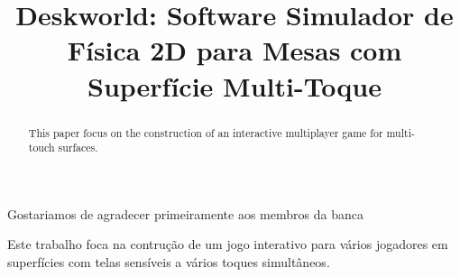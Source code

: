 \documentclass[bacharelado]{unb-cic}
\title{Deskworld: Software Simulador de F\'isica 2D para Mesas com Superf\'icie Multi-Toque}
\begin{document}
\maketitle

\pretextual
\begin{agradecimentos}
Gostariamos de agradecer primeiramente aos membros da banca
\end{agradecimentos}

\begin{resumo}
Este trabalho foca na contru\c{c}\~ao de um jogo interativo para v\'arios jogadores em superf\' icies com telas sens\'iveis a v\'arios toques simult\^aneos.
\end{resumo}


\begin{abstract}
This paper focus on the construction of an interactive multiplayer game for multi-touch surfaces.
\end{abstract}

\tableofcontents
\listoffigures
\listoftables

\textual






%
%


\postextual





\appendix



\end{document}
